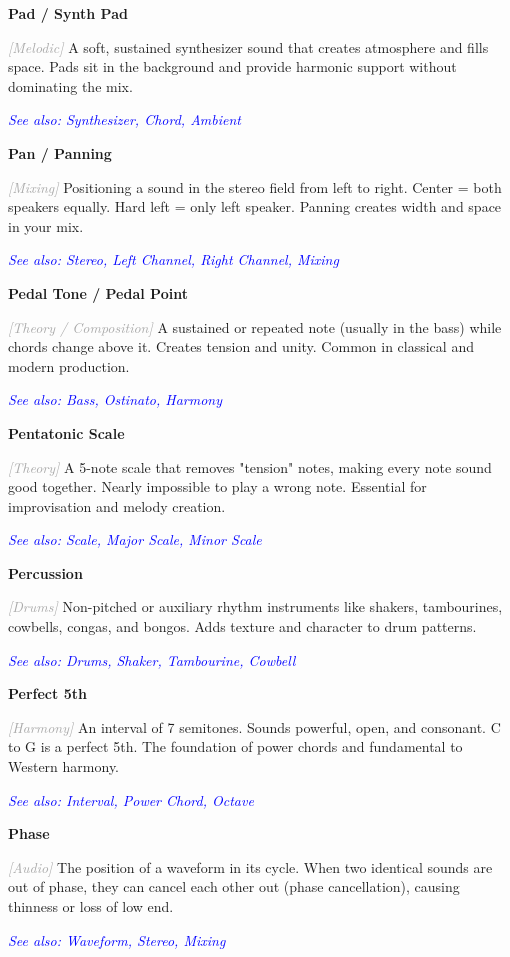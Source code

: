 \documentclass[11pt,letterpaper]{article}
\newcommand{\term}[1]{\textbf{\large\color{purple}#1}}
\newcommand{\category}[1]{\textcolor{darkgray}{\textit{\small [#1]}}}
\newcommand{\seealso}[1]{\textcolor{blue}{\textit{See also: #1}}}
\newenvironment{termdef}[1]
  {\noindent\term{#1}\par\nopagebreak}
  {\par\vspace{0.3em}}
\begin{document}
\begin{termdef}{Pad / Synth Pad}
\category{Melodic}
A soft, sustained synthesizer sound that creates atmosphere and fills space. Pads sit in the background and provide harmonic support without dominating the mix.

\seealso{Synthesizer, Chord, Ambient}
\end{termdef}

\begin{termdef}{Pan / Panning}
\category{Mixing}
Positioning a sound in the stereo field from left to right. Center = both speakers equally. Hard left = only left speaker. Panning creates width and space in your mix.

\seealso{Stereo, Left Channel, Right Channel, Mixing}
\end{termdef}

\begin{termdef}{Pedal Tone / Pedal Point}
\category{Theory / Composition}
A sustained or repeated note (usually in the bass) while chords change above it. Creates tension and unity. Common in classical and modern production.

\seealso{Bass, Ostinato, Harmony}
\end{termdef}

\begin{termdef}{Pentatonic Scale}
\category{Theory}
A 5-note scale that removes "tension" notes, making every note sound good together. Nearly impossible to play a wrong note. Essential for improvisation and melody creation.

\seealso{Scale, Major Scale, Minor Scale}
\end{termdef}

\begin{termdef}{Percussion}
\category{Drums}
Non-pitched or auxiliary rhythm instruments like shakers, tambourines, cowbells, congas, and bongos. Adds texture and character to drum patterns.

\seealso{Drums, Shaker, Tambourine, Cowbell}
\end{termdef}

\begin{termdef}{Perfect 5th}
\category{Harmony}
An interval of 7 semitones. Sounds powerful, open, and consonant. C to G is a perfect 5th. The foundation of power chords and fundamental to Western harmony.

\seealso{Interval, Power Chord, Octave}
\end{termdef}

\begin{termdef}{Phase}
\category{Audio}
The position of a waveform in its cycle. When two identical sounds are out of phase, they can cancel each other out (phase cancellation), causing thinness or loss of low end.

\seealso{Waveform, Stereo, Mixing}
\end{termdef}
\end{document}
